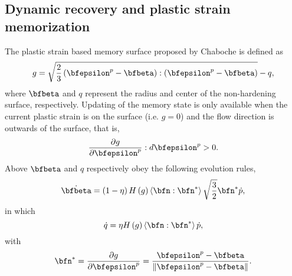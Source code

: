 \subsection{Dynamic recovery and plastic strain memorization}
\noindent
The plastic strain based memory surface proposed by Chaboche \cite{Chaboche1986149} is defined as
\begin{equation}
\label{Equ:g1}
g = \sqrt {\frac{2}{3}\left( {{\bfepsilon^p} - \bfbeta} \right):\left( {{\bfepsilon^p} - \bfbeta} \right)}  - q,
\end{equation}
where $\bfbeta$ and $q$ represent the radius and center of the non-hardening surface, respectively.
Updating of the memory state is only available when the current plastic strain is on the surface (i.e. $g=0$) and the flow direction is outwards of the surface, that is,
\begin{equation}
\frac{{\partial g}}{{\partial {\bfepsilon^p}}}:d{\bfepsilon^p} > 0.
\end{equation}
Above $\bfbeta$ and $q$ respectively obey the following evolution rules,
\begin{equation}
\label{Equ:dotbeta1}
\dot\bfbeta  = \left( {1 - \eta } \right)H\left( g \right)\left\langle {\bfn:{\bfn^*}} \right\rangle \sqrt {\frac{3}{2}} {\bfn^*}\dot p,
\end{equation}
in which
\begin{equation}
\label{Equ:dotq1}
\dot q = \eta H\left( g \right)\left\langle {\bfn:{\bfn^*}} \right\rangle \dot p,
\end{equation}
with
\begin{equation}
\label{Equ:nstar}
{\bfn^*} = \frac{{\partial g}}{{\partial {\bfepsilon^p}}} = \frac{{{\bfepsilon^p} - \bfbeta}}{{\left\| {{\bfepsilon^p} - \bfbeta} \right\|}}.
\end{equation}


